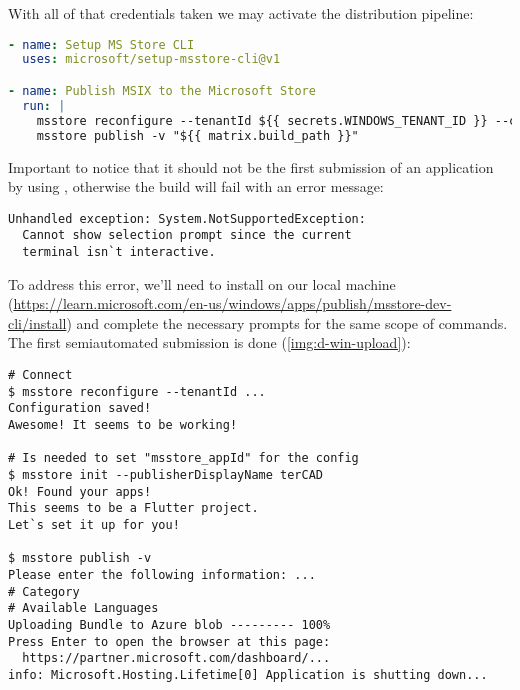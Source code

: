 
\noindent With all of that credentials taken we may activate the distribution pipeline:

\begin{lstlisting}[language=yaml]
- name: Setup MS Store CLI
  uses: microsoft/setup-msstore-cli@v1

- name: Publish MSIX to the Microsoft Store
  run: |
    msstore reconfigure --tenantId ${{ secrets.WINDOWS_TENANT_ID }} --clientId ${{ secrets.WINDOWS_CLIENT_ID }} --clientSecret ${{ secrets.WINDOWS_SECRET }} --sellerId ${{ secrets.WINDOWS_SELLER_ID }}
    msstore publish -v "${{ matrix.build_path }}"
\end{lstlisting}

\noindent Important to notice that it should not be the first submission of an application by using , 
otherwise the build will fail with an error message:

\begin{lstlisting}[language=terminal]
Unhandled exception: System.NotSupportedException: 
  Cannot show selection prompt since the current 
  terminal isn`t interactive.
\end{lstlisting}

\noindent To address this error, we'll need to install  on our local machine 
(\href{https://learn.microsoft.com/en-us/windows/apps/publish/msstore-dev-cli/install}{https://learn.microsoft.com/en-us/windows/apps/publish/msstore-dev-cli/install})
and complete the necessary prompts for the same scope of commands. The first semiautomated submission is done 
(\cref{img:d-win-upload}):

\begin{lstlisting}[language=terminal]
# Connect
$ msstore reconfigure --tenantId ...
Configuration saved!
Awesome! It seems to be working!

# Is needed to set "msstore_appId" for the config
$ msstore init --publisherDisplayName terCAD
Ok! Found your apps!                    
This seems to be a Flutter project.
Let`s set it up for you!

$ msstore publish -v
Please enter the following information: ...
# Category
# Available Languages
Uploading Bundle to Azure blob --------- 100%
Press Enter to open the browser at this page:
  https://partner.microsoft.com/dashboard/...
info: Microsoft.Hosting.Lifetime[0] Application is shutting down...
\end{lstlisting}


